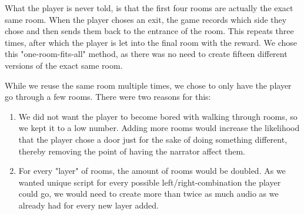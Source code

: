 What the player is never told, is that the first four rooms are actually the exact same room. When the player choses an exit, the game records which side they chose and then sends them back to the entrance of the room. This repeats three times, after which the player is let into the final room with the reward. We chose this "one-room-fits-all" method, as there was no need to create fifteen different versions of the exact same room.

While we reuse the same room multiple times, we chose to only have the player go through a few rooms. There were two reasons for this:
\begin{enumerate}
	\item We did not want the player to become bored with walking through rooms, so we kept it to a low number. Adding more rooms would increase the likelihood that the player chose a door just for the sake of doing something different, thereby removing the point of having the narrator affect them.
	\item For every "layer" of rooms, the amount of rooms would be doubled. As we wanted unique script for every possible left/right-combination the player could go, we would need to create more than twice as much audio as we already had for every new layer added.
\end{enumerate}